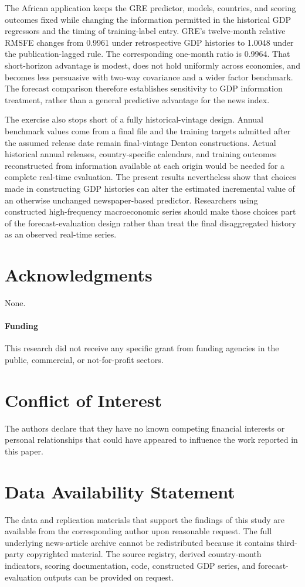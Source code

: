 \documentclass[preprint,12pt,authoryear]{elsarticle}
\begin{document}
The African application keeps the GRE predictor, models, countries, and scoring outcomes fixed while changing the information permitted in the historical GDP regressors and the timing of training-label entry. GRE's twelve-month relative RMSFE changes from 0.9961 under retrospective GDP histories to 1.0048 under the publication-lagged rule. The corresponding one-month ratio is 0.9964. That short-horizon advantage is modest, does not hold uniformly across economies, and becomes less persuasive with two-way covariance and a wider factor benchmark. The forecast comparison therefore establishes sensitivity to GDP information treatment, rather than a general predictive advantage for the news index.

The exercise also stops short of a fully historical-vintage design. Annual benchmark values come from a final file and the training targets admitted after the assumed release date remain final-vintage Denton constructions. Actual historical annual releases, country-specific calendars, and training outcomes reconstructed from information available at each origin would be needed for a complete real-time evaluation. The present results nevertheless show that choices made in constructing GDP histories can alter the estimated incremental value of an otherwise unchanged newspaper-based predictor. Researchers using constructed high-frequency macroeconomic series should make those choices part of the forecast-evaluation design rather than treat the final disaggregated history as an observed real-time series.

\section*{Acknowledgments}
None.

\paragraph{Funding} This research did not receive any specific grant from funding agencies in the public, commercial, or not-for-profit sectors.

\section*{Conflict of Interest}
The authors declare that they have no known competing financial interests or personal relationships that could have appeared to influence the work reported in this paper.

\section*{Data Availability Statement}
The data and replication materials that support the findings of this study are available from the corresponding author upon reasonable request. The full underlying news-article archive cannot be redistributed because it contains third-party copyrighted material. The source registry, derived country-month indicators, scoring documentation, code, constructed GDP series, and forecast-evaluation outputs can be provided on request.
\end{document}
